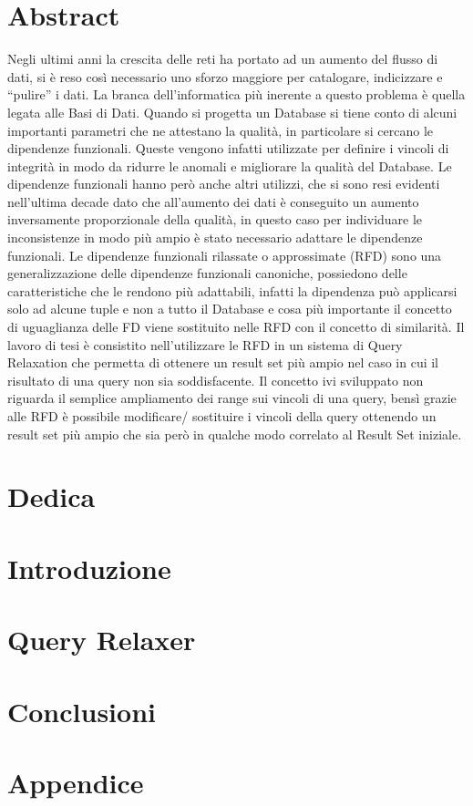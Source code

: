 \documentclass[12pt,oneside]{report}
\begin{document}
\chapter{Abstract}
Negli ultimi anni la crescita delle reti ha portato ad un aumento del flusso di dati, si è reso così necessario uno sforzo maggiore per catalogare, indicizzare e “pulire” i  dati. 
La branca dell’informatica più inerente a questo problema è quella legata alle Basi di Dati. 
Quando si progetta un Database si tiene conto di alcuni importanti parametri che ne attestano la qualità, in particolare si cercano le dipendenze funzionali. Queste vengono infatti utilizzate per definire i vincoli di integrità in modo da ridurre le anomali e migliorare la qualità del Database.
Le dipendenze funzionali hanno però anche altri utilizzi, che si sono resi evidenti nell’ultima decade dato che all’aumento dei dati è conseguito un aumento inversamente proporzionale della qualità, in questo caso per individuare le inconsistenze in modo più ampio è stato necessario adattare le dipendenze funzionali.
Le dipendenze funzionali rilassate o approssimate (RFD) sono una generalizzazione delle dipendenze funzionali canoniche, possiedono delle caratteristiche che le rendono più adattabili, infatti la dipendenza può applicarsi solo ad alcune tuple e non a tutto il Database e cosa più importante il concetto di uguaglianza delle FD viene sostituito nelle RFD con il concetto di similarità. 
Il lavoro di tesi è consistito nell’utilizzare le RFD in un sistema di Query Relaxation che permetta di ottenere un result set più ampio nel caso in cui il risultato di una query non sia soddisfacente.
Il concetto ivi sviluppato non riguarda il semplice ampliamento dei range sui vincoli di una query, bensì grazie alle RFD è possibile modificare/ sostituire i vincoli della query ottenendo un result set più ampio che sia però in qualche modo correlato al Result Set iniziale.

\chapter*{Dedica}


\tableofcontents

\chapter{Introduzione}


\chapter{Query Relaxer}


\chapter{Conclusioni}


\appendix
\chapter{Appendice}


\listoffigures
\end{document}
